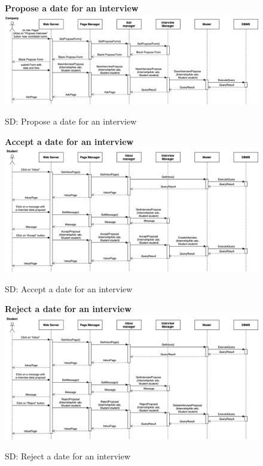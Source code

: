 \begin{figure}[H]
\textbf{Propose a date for an interview}\newline\newline
\includegraphics[width=15cm]{images/architectural design/runtime/DD-UC20.1.drawio.png}
    \caption{SD: Propose a date for an interview}
\end{figure}

\begin{figure}[H]
\textbf{Accept a date for an interview}\newline\newline
\includegraphics[width=15cm]{images/architectural design/runtime/DD-UC20.2.drawio.png}
    \caption{SD: Accept a date for an interview}
\end{figure}

\begin{figure}[H]
\textbf{Reject a date for an interview}\newline\newline
\includegraphics[width=15cm]{images/architectural design/runtime/DD-UC20.3.drawio.png}
    \caption{SD: Reject a date for an interview}
\end{figure}

